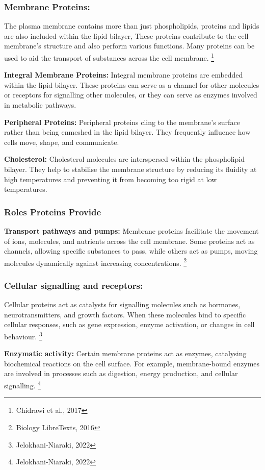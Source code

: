 \documentclass[a4paper,12pt,twoside,english]{all-in-one} %
\begin{document}
\subsubsection{Membrane Proteins:}
The plasma membrane contains more than just phospholipids, proteins and lipids are also included within the lipid bilayer, These proteins contribute to the cell membrane's structure and also perform various functions. Many proteins can be used to aid the transport of substances across the cell membrane. \footnote{Chidrawi et al., 2017}

\textbf{Integral Membrane Proteins:}
Integral membrane proteins are embedded within the lipid bilayer. These proteins can serve as a channel for other molecules or receptors for signalling other molecules, or they can serve as enzymes involved in metabolic pathways.

\textbf{Peripheral Proteins:}
Peripheral proteins cling to the membrane's surface rather than being enmeshed in the lipid bilayer. They frequently influence how cells move, shape, and communicate.

\textbf{Cholesterol:} 
Cholesterol molecules are interspersed within the phospholipid bilayer. They help to stabilise the membrane structure by reducing its fluidity at high temperatures and preventing it from becoming too rigid at low temperatures.

\subsubsection{Roles Proteins Provide}
\textbf{Transport pathways and pumps:}
Membrane proteins facilitate the movement of ions, molecules, and nutrients across the cell membrane. Some proteins act as channels, allowing specific substances to pass, while others act as pumps, moving molecules dynamically against increasing concentrations. \footnote{Biology LibreTexts, 2016}

\subsubsection{Cellular signalling and receptors:}
Cellular proteins act as catalysts for signalling molecules such as hormones, neurotransmitters, and growth factors. When these molecules bind to specific cellular responses, such as gene expression, enzyme activation, or changes in cell behaviour. \footnote{Jelokhani-Niaraki, 2022}

\textbf{Enzymatic activity:}
Certain membrane proteins act as enzymes, catalysing biochemical reactions on the cell surface. For example, membrane-bound enzymes are involved in processes such as digestion, energy production, and cellular signalling. \footnote{Jelokhani-Niaraki, 2022}
\end{document}
